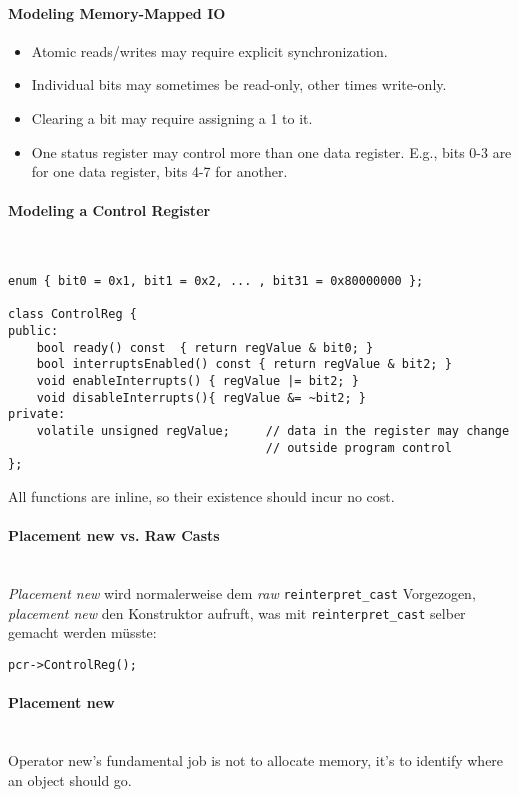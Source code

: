 \paragraph{Modeling Memory-Mapped IO}
\begin{itemize}
	\item Atomic reads/writes may require explicit synchronization.
	\item Individual bits may sometimes be read-only, other times write-only.
	\item Clearing a bit may require assigning a 1 to it.
	\item One status register may control more than one data register.
		E.g., bits 0-3 are for one data register, bits 4-7 for another.	
\end{itemize}

\paragraph{Modeling a Control Register}~
\begin{lstlisting}
enum { bit0 = 0x1, bit1 = 0x2, ... , bit31 = 0x80000000 };

class ControlReg {
public:
	bool ready() const 	{ return regValue & bit0; }
	bool interruptsEnabled() const { return regValue & bit2; }
	void enableInterrupts() { regValue |= bit2; }
	void disableInterrupts(){ regValue &= ~bit2; }
private:
	volatile unsigned regValue;		// data in the register may change
									// outside program control
};
\end{lstlisting}

All functions are inline, so their existence should incur no cost.

\paragraph{Placement new vs. Raw Casts}~\\
\emph{Placement new} wird normalerweise dem \emph{raw} \texttt{reinterpret\_cast} Vorgezogen, \emph{placement new} den Konstruktor aufruft, was mit \texttt{reinterpret\_cast} selber gemacht werden müsste:
\begin{lstlisting}
pcr->ControlReg();
\end{lstlisting}

\paragraph{Placement new}~\\
Operator new’s fundamental job is not to allocate memory, it’s to identify where an object should go.

